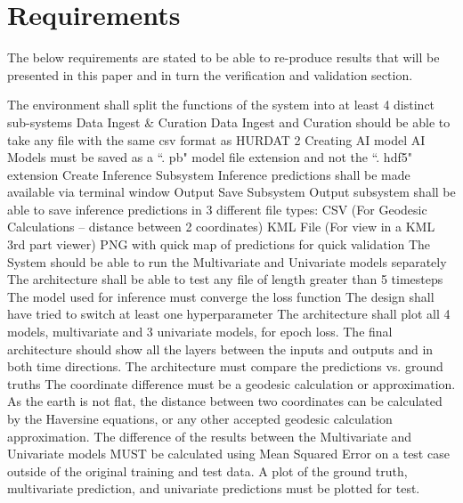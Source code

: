 \documentclass{article}
\begin{document}
\section{Requirements}
The below requirements are stated to be able to re-produce results that will be presented in this paper and in turn the verification and validation section.

The environment shall split the functions of the system into at least 4 distinct sub-systems
Data Ingest & Curation
Data Ingest and Curation should be able to take any file with the same csv format as HURDAT 2
Creating AI model
AI Models must be saved as a “. pb" model file extension and not the “. hdf5" extension
Create Inference Subsystem
Inference predictions shall be made available via terminal window
Output Save Subsystem
Output subsystem shall be able to save inference predictions in 3 different file types:
CSV (For Geodesic Calculations – distance between 2 coordinates)
KML File (For view in a KML 3rd part viewer)
PNG with quick map of predictions for quick validation
The System should be able to run the Multivariate and Univariate models separately
The architecture shall be able to test any file of length greater than 5 timesteps
The model used for inference must converge the loss function
The design shall have tried to switch at least one hyperparameter
The architecture shall plot all 4 models, multivariate and 3 univariate models, for epoch loss.
The final architecture should show all the layers between the inputs and outputs and in both time directions.
The architecture must compare the predictions vs. ground truths 
The coordinate difference must be a geodesic calculation or approximation.
As the earth is not flat, the distance between two coordinates can be calculated by the Haversine equations, or any other accepted geodesic calculation approximation.
The difference of the results between the Multivariate and Univariate models MUST be calculated using Mean Squared Error on a test case outside of the original training and test data.
 A plot of the ground truth, multivariate prediction, and univariate predictions must be plotted for test.
\end{document}
